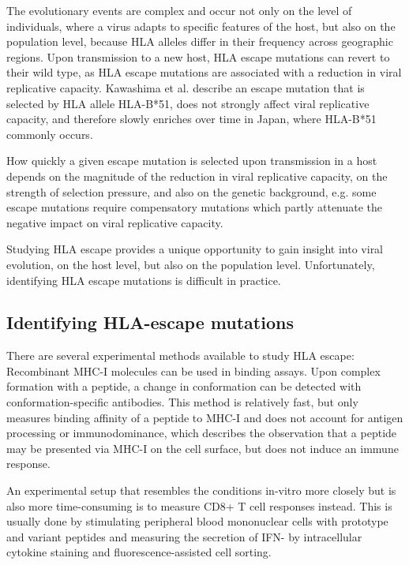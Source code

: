 \documentclass[fleqn,11pt]{SelfArx} %
\begin{document}
The evolutionary events are complex and occur not only on the level of individuals, where a virus adapts to specific features of the host, but also on the population level, because HLA alleles differ in their frequency across geographic regions\nolinebreak\cite{Kawashima2009}. Upon transmission to a new host, HLA escape mutations can revert to their wild type, as HLA escape mutations are associated with a reduction in viral replicative capacity\nolinebreak\cite{Matthews2008}. Kawashima et al. \nolinebreak\cite{Kawashima2009} describe an escape mutation that is selected by HLA allele HLA-B*51, does not strongly affect viral replicative capacity, and therefore slowly enriches over time in Japan, where HLA-B*51 commonly occurs.

How quickly a given escape mutation is selected upon transmission in a host depends on the magnitude of the reduction in viral replicative capacity, on the strength of selection pressure, and also on the genetic background, e.g. some escape mutations require compensatory mutations which partly attenuate the negative impact on viral replicative capacity.

Studying HLA escape provides a unique opportunity to gain insight into viral evolution, on the host level, but also on the population level.
Unfortunately, identifying HLA escape mutations is difficult in practice.

\subsection{Identifying HLA-escape mutations}

There are several experimental methods available to study HLA escape: Recombinant MHC-I molecules can be used in binding assays. Upon complex formation with a peptide, a change in conformation can be detected with conformation-specific antibodies. This method is relatively fast, but only measures binding affinity of a peptide to MHC-I and does not account for antigen processing or immunodominance, which describes the observation that a peptide may be presented via MHC-I on the cell  surface, but does not induce an immune response.

An experimental setup that resembles the conditions in-vitro more closely but is also more time-consuming is to measure CD8+ T cell responses instead. This is usually done by stimulating peripheral blood mononuclear cells with prototype and variant peptides and measuring the secretion of IFN-\gamma{} by intracellular cytokine staining and fluorescence-assisted cell sorting.
\end{document}
